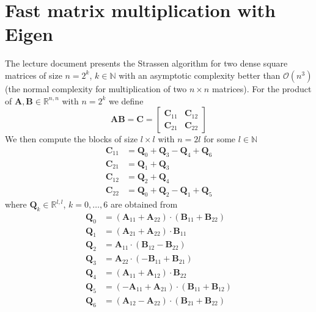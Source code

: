 \documentclass{article}
\begin{document}
\section*{Fast matrix multiplication with Eigen}
The lecture document presents the Strassen algorithm for two dense square matrices of size $n = 2^{k}$, $k \in \mathbb{N}$ with an asymptotic complexity better than $\mathcal{O}\left(n^{3}\right)$ (the normal complexity for multiplication of two $n \times n$ matrices). For the product of $\mathbf{A}, \mathbf{B} \in \mathbb{R}^{n,n}$ with $n = 2^{k}$ we define
\begin{equation*}
    \mathbf{A}\mathbf{B} = \mathbf{C} = \begin{bmatrix}
    \mathbf{C}_{11} & \mathbf{C}_{12} \\
    \mathbf{C}_{21} & \mathbf{C}_{22}
    \end{bmatrix}
\end{equation*}
We then compute the blocks of size $l \times l$ with $n = 2l$ for some $l \in \mathbb{N}$
\begin{align*}
    \mathbf{C}_{11} &= \mathbf{Q}_{0} + \mathbf{Q}_{3} - \mathbf{Q}_{4} + \mathbf{Q}_{6} \\
    \mathbf{C}_{21} &= \mathbf{Q}_{1} + \mathbf{Q}_{3} \\
    \mathbf{C}_{12} &= \mathbf{Q}_{2} + \mathbf{Q}_{4} \\
    \mathbf{C}_{22} &= \mathbf{Q}_{0} + \mathbf{Q}_{2} - \mathbf{Q}_{1} + \mathbf{Q}_{5}
\end{align*}
where $\mathbf{Q}_{k} \in \mathbb{R}^{l,l}$, $k = 0, \dots, 6$ are obtained from
\begin{align*}
    \mathbf{Q}_{0} &= \left(\mathbf{A}_{11} + \mathbf{A}_{22}\right) \cdot \left(\mathbf{B}_{11} + \mathbf{B}_{22}\right) \\
    \mathbf{Q}_{1} &= \left(\mathbf{A}_{21} + \mathbf{A}_{22}\right) \cdot \mathbf{B}_{11} \\
    \mathbf{Q}_{2} &= \mathbf{A}_{11} \cdot \left(\mathbf{B}_{12} - \mathbf{B}_{22}\right) \\
    \mathbf{Q}_{3} &= \mathbf{A}_{22} \cdot \left(-\mathbf{B}_{11} + \mathbf{B}_{21}\right) \\
    \mathbf{Q}_{4} &= \left(\mathbf{A}_{11} + \mathbf{A}_{12}\right) \cdot \mathbf{B}_{22} \\
    \mathbf{Q}_{5} &= \left(-\mathbf{A}_{11} + \mathbf{A}_{21}\right) \cdot \left(\mathbf{B}_{11} + \mathbf{B}_{12}\right) \\
    \mathbf{Q}_{6} &= \left(\mathbf{A}_{12} - \mathbf{A}_{22}\right) \cdot \left(\mathbf{B}_{21} + \mathbf{B}_{22}\right)
\end{align*}
\end{document}
